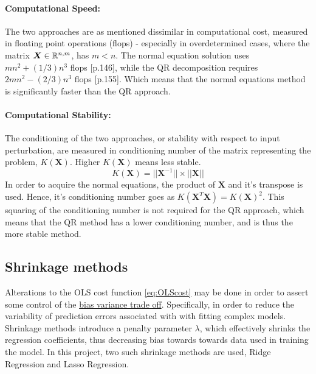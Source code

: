 \documentclass[%
oneside,                 %
final,                   %
10pt]{article}
\begin{document}
\paragraph*{Computational Speed:}
The two approaches are as mentioned dissimilar in computational cost, measured in floating point operations (flops) - especially in overdetermined cases, where the matrix $\bm{X}\in {\Bbb R}^{n,m}$, has $m<n$.
The normal equation solution uses $mn^2
+ (1/3)n^3$ flops \citep{Ascher}[p.146], while the QR decomposition requires $2mn^2−(2/3)n^3$ flops  \citep{Ascher}[p.155]. Which means that the normal equations method is significantly faster than the QR approach.


\paragraph*{Computational Stability:}
The conditioning of the two approaches, or stability with respect to input perturbation, are measured in conditioning number of the matrix representing the problem, $K(\bm{X})$. Higher $K(\bm{X})$ means less stable. 
\begin{equation}
K(\bm{X})=||\bm{X}^{-1}|| \times ||\bm{X}||
\end{equation}
In order to acquire the normal equations, the product of $\bm{X}$ and it's transpose is used. Hence, it's conditioning number goes as $K(\bm{X}^T\bm{X})=K(\bm{X})^2$. This squaring of the conditioning number is not required for the QR approach, which means that the QR method has a lower conditioning number, and is thus the more stable method.

\subsection{Shrinkage methods}
Alterations to the OLS cost function \eqref{eq:OLScost} may be done in order to assert some control of the  \hyperref[S:M_Biasvar]{bias variance trade off}. Specifically, in order to reduce the variability of prediction errors associated with with fitting complex models. Shrinkage methods introduce a penalty parameter $\lambda$, which effectively shrinks the regression coefficients, thus decreasing bias towards towards data used in training the model. In this project, two such shrinkage methods are used, Ridge Regression and Lasso Regression. 
\end{document}
